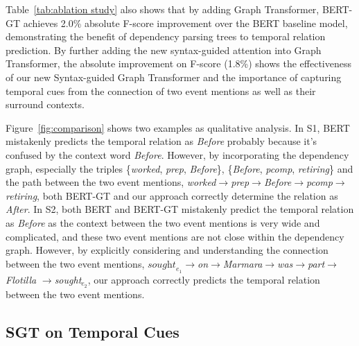 Table~\ref{tab:ablation study} also shows that by adding Graph Transformer, BERT-GT achieves 2.0\% absolute F-score improvement over the BERT baseline model, demonstrating the benefit of dependency parsing trees to temporal relation prediction. By further adding the new syntax-guided attention into Graph Transformer, the absolute improvement on F-score (1.8\%) shows the effectiveness of our new Syntax-guided Graph Transformer and the importance of capturing temporal cues from the connection of two event mentions as well as their surround contexts.












Figure~\ref{fig:comparison} shows two examples as qualitative analysis. In S1, BERT mistakenly predicts the temporal relation as \textit{Before} probably because it's confused by the context word \textit{Before}. However, by incorporating the dependency graph, especially the triples \{\textit{worked}, \textit{prep}, \textit{Before}\}, \{\textit{Before}, \textit{pcomp}, \textit{retiring}\} and the path between the two event mentions, \textit{worked}$\rightarrow$\textit{prep}$\rightarrow$\textit{Before}$\rightarrow$\textit{pcomp}$\rightarrow$\textit{retiring}, both BERT-GT and our approach correctly determine the relation as \textit{After}. In S2, both BERT and BERT-GT mistakenly predict the temporal relation as \textit{Before} as the context between the two event mentions is very wide and complicated, and these two event mentions are not close within the dependency graph. However, by explicitly considering and understanding the connection between the two event mentions, $\textit{sought}_{e_1}$$\rightarrow$\textit{on}$\rightarrow$\textit{Marmara}$\rightarrow$\textit{was}$\rightarrow$\textit{part}$\rightarrow$\textit{Flotilla}
$\rightarrow$\textit{sought}$_{e_2}$, our approach correctly predicts the temporal relation between the two event mentions.







\subsection{SGT on Temporal Cues}


